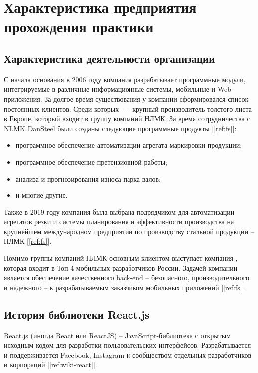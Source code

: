 \section{Характеристика предприятия прохождения практики}
\subsection{Характеристика деятельности организации}
С начала основания в 2006 году компания  разрабатывает
программные модули, интегрируемые в различные информационные системы, мобильные
и Web- приложения. За долгое время существования у компании сформировался список
постоянных клиентов. Среди которых --  -- крупный
производитель толстого листа в Европе, который входит в группу компаний НЛМК. За
время сотрудничества с NLMK DanSteel были созданы следующие программные
продукты [\ref{ref:fs}]:
\begin{itemize}
    \item программное обеспечение автоматизации агрегата маркировки продукции;
    \item программное обеспечение претензионной работы;
    \item анализа и прогнозирования износа парка валов;
    \item и многие другие.
\end{itemize}

Также в 2019 году компания была выбрана подрядчиком для автоматизации агрегатов
резки и системы планирования и эффективности производства на крупнейшем
международном предприятии по производству стальной продукции -- НЛМК [\ref{ref:fs}].

Помимо группы компаний НЛМК основным клиентом  выступает
компания , которая входит в Топ-4 мобильных разработчиков
России. Задачей компании является обеспечение качественного back-end --
безопасного, производительного и надежного -- к разрабатываемым заказчиком
мобильных приложений [\ref{ref:fs}].

\subsection{История библиотеки React.js}
React.js (иногда React или ReactJS) -- JavaScript-библиотека с открытым исходным
кодом для разработки пользовательских интерфейсов. Разрабатывается и
поддерживается Facebook, Instagram и сообществом отдельных разработчиков и
корпораций [\ref{ref:wiki-react}].

